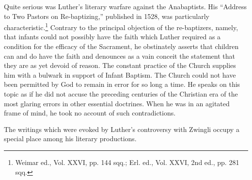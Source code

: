 Quite serious was Luther’s literary warfare against the Anabaptists.
His “Address to Two Pastors on Re-baptizing,” published in 1528,
was particularly characteristic.\footnote{Weimar ed., Vol. XXVI, pp. 144 sqq.; Erl. ed., Vol. XXVI, 2nd ed., pp. 281 sqq.}
 Contrary to the principal objection
of the re-baptizers, namely, that infants could not possibly have the
faith which Luther required as a condition for the efficacy of the
Sacrament, he obstinately asserts that children can and do have the
faith and denounces as a vain conceit the statement that they are as
yet devoid of reason. The constant practice of the Church supplies him
with a bulwark in support of Infant Baptism. The Church could not
have been permitted by God to remain in error for so long a time. He
speaks on this topic as if he did not accuse the preceding centuries of
the Christian era of the most glaring errors in other essential doctrines.
When he was in an agitated frame of mind, he took no account of such
contradictions.

The writings which were evoked by Luther’s controversy with
Zwingli occupy a special place among his literary productions.

